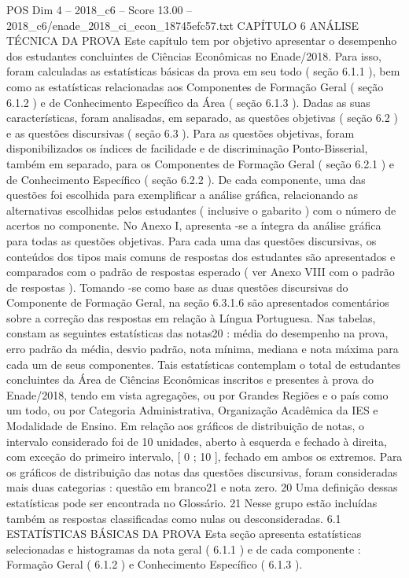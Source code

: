 \begin{textsample}{POS Dim 4 – 2018\_c6 – Score 13.00 – 2018\_c6/enade\_2018\_ci\_econ\_18745efc57.txt}  \label{ex:f4_pos_011}
CAPÍTULO 6 ANÁLISE TÉCNICA DA PROVA Este capítulo tem por objetivo apresentar o desempenho dos estudantes concluintes de Ciências Econômicas no Enade/2018.
Para isso, foram calculadas as estatísticas básicas da prova em seu todo ( seção 6.1.1 ), bem como as estatísticas relacionadas aos Componentes de Formação Geral ( seção 6.1.2 ) e de Conhecimento Específico da Área ( seção 6.1.3 ).
Dadas as suas características, foram analisadas, em separado, as questões objetivas ( seção 6.2 ) e as questões discursivas ( seção 6.3 ).
Para as questões objetivas, foram disponibilizados os índices de facilidade e de discriminação Ponto-Bisserial, também em separado, para os Componentes de Formação Geral ( seção 6.2.1 ) e de Conhecimento Específico ( seção 6.2.2 ).
De cada componente, uma das questões foi escolhida para exemplificar a análise gráfica, relacionando as alternativas escolhidas pelos estudantes ( inclusive o gabarito ) com o número de acertos no componente.
No Anexo I, apresenta -se a íntegra da análise gráfica para todas as questões objetivas.
Para cada uma das questões discursivas, os conteúdos dos tipos mais comuns de respostas dos estudantes são apresentados e comparados com o padrão de respostas esperado ( ver Anexo VIII com o padrão de respostas ).
Tomando -se como base as duas questões discursivas do Componente de Formação Geral, na seção 6.3.1.6 são apresentados comentários sobre a correção das respostas em relação à Língua Portuguesa.
Nas tabelas, constam as seguintes estatísticas das notas20 : média do desempenho na prova, erro padrão da média, desvio padrão, nota mínima, mediana e nota máxima para cada um de seus componentes.
Tais estatísticas contemplam o total de estudantes concluintes da Área de Ciências Econômicas inscritos e presentes à prova do Enade/2018, tendo em vista agregações, ou por Grandes Regiões e o país como um todo, ou por Categoria Administrativa, Organização Acadêmica da IES e Modalidade de Ensino.
Em relação aos gráficos de distribuição de notas, o intervalo considerado foi de 10 unidades, aberto à esquerda e fechado à direita, com exceção do primeiro intervalo, [ 0 ; 10 ], fechado em ambos os extremos.
Para os gráficos de distribuição das notas das questões discursivas, foram consideradas mais duas categorias : questão em branco21 e nota zero. 20 Uma definição dessas estatísticas pode ser encontrada no Glossário. 21 Nesse grupo estão incluídas também as respostas classificadas como nulas ou desconsideradas. 6.1 ESTATÍSTICAS BÁSICAS DA PROVA Esta seção apresenta estatísticas selecionadas e histogramas da nota geral ( 6.1.1 ) e de cada componente : Formação Geral ( 6.1.2 ) e Conhecimento Específico ( 6.1.3 ).

\end{textsample}
